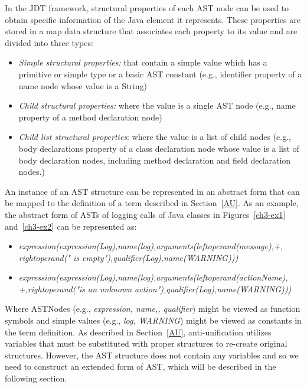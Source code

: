 In the JDT framework, structural properties of each AST node can be used to obtain specific information of the Java element it represents. These properties are stored in a map data structure that associates each property to its value and are divided into three types:
\begin{itemize} [leftmargin=0.7in]
\item \textit{Simple structural properties:} that contain a simple value which has a primitive or simple type or a basic AST constant (e.g., identifier property of a name node whose value is a String)
\item \textit{Child structural properties:} where the value is a single AST node (e.g., name property of a method declaration node)
\item \textit{Child list structural properties}: where the value is a list of child nodes (e.g., body declarations property of a class declaration node whose value is a list of body declaration nodes, including method declaration and field declaration nodes.)
\end{itemize}
An instance of an AST structure can be represented in an abstract form that can be mapped to the definition of a term described in Section~\ref{AU}. As an example, the abstract form of ASTs of logging calls of Java classes in Figures~\ref{ch3-ex1} and~\ref{ch3-ex2} can be represented as:
\begin{itemize} [leftmargin=0.7in]
\item \textit{expression(expression(Log),name(log),arguments(leftoperand(message),+,\\rightoperand(" is empty"),qualifier(Log),name(WARNING)))}
\item \textit{expression(expression(Log),name(log),arguments(leftoperand(actionName),\\+,rightoperand("is an unknown action"),qualifier(Log),name(WARNING)))}
\end{itemize}

Where ASTNodes (e.g., \textit{expression, name,, qualifier}) might be viewed as function symbols and simple values (e.g., \textit{log, WARNING}) might be viewed as constants in the term definition. As described in Section~\ref{AU}, anti-unification utilizes variables that must be substituted with proper structures to re-create original structures. However, the AST structure does not contain any variables and so we need to construct an extended form of AST, which will be described in the following section.


